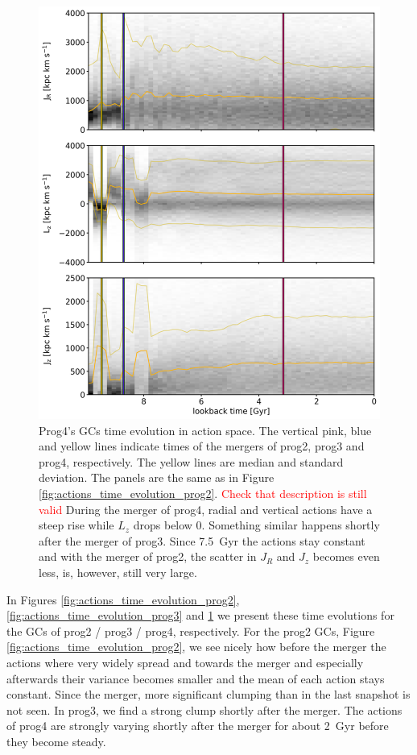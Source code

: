 \begin{figure}[htbp]
\captionsetup{format=plain}
    \centering
	\includegraphics[width=\textwidth]{plots/Dynamics/prog4/action_time_evolution_wodisk_hist_mean.png}
    \caption{Prog4's \acp{GC} time evolution in action space. The vertical pink, blue and yellow lines indicate times of the mergers of prog2, prog3 and prog4, respectively. The yellow lines are median and standard deviation. The panels are the same as in Figure \ref{fig:actions_time_evolution_prog2}. \textcolor{red}{Check that description is still valid} During the merger of prog4, radial and vertical actions have a steep rise while $L_z$ drops below 0. Something similar happens shortly after the merger of prog3. Since \SI{7.5}{Gyr} the actions stay constant and with the merger of prog2, the scatter in $J_R$ and $J_z$ becomes even less, is, however, still very large.}\label{fig:actions_time_evolution_prog4}
\end{figure}
In Figures \ref{fig:actions_time_evolution_prog2}, \ref{fig:actions_time_evolution_prog3} and \ref{fig:actions_time_evolution_prog4} we present these time evolutions for the \acp{GC} of prog2 / prog3 / prog4, respectively. For the prog2 \acp{GC}, Figure \ref{fig:actions_time_evolution_prog2}, we see nicely how before the merger the actions where very widely spread and towards the merger and especially afterwards their variance becomes smaller and the mean of each action stays constant. Since the merger, more significant clumping than in the last snapshot is not seen. In prog3, we find a strong clump shortly after the merger. The actions of prog4 are strongly varying shortly after the merger for about \SI{2}{Gyr} before they become steady.

